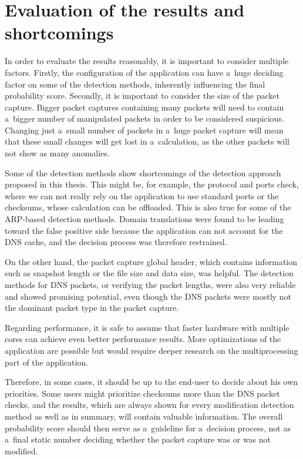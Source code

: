 \documentclass[
  printed,     %
  color,       %
  oneside,     %
  nosansbold,  %
  nocolorbold, %
  nolof,         %
  nolot,         %
]{fithesis4}
\begin{document}
\section{Evaluation of the results and shortcomings}

In order to evaluate the results reasonably, it is important to consider multiple factors. Firstly, the configuration of the application can have a~huge deciding factor on some of the detection methods, inherently influencing the final probability score. Secondly, it is important to consider the size of the packet capture. Bigger packet captures containing many packets will need to contain a~bigger number of manipulated packets in order to be considered suspicious. Changing just a~small number of packets in a~huge packet capture will mean that these small changes will get lost in a~calculation, as the other packets will not show as many anomalies.

Some of the detection methods show shortcomings of the detection approach proposed in this thesis. This might be, for example, the protocol and ports check, where we can not really rely on the application to use standard ports or the checksums, whose calculation can be offloaded. This is also true for some of the ARP-based detection methods. Domain translations were found to be leading toward the false positive side because the application can not account for the DNS cache, and the decision process was therefore restrained.

On the other hand, the packet capture global header, which contains information such as snapshot length or the file size and data size, was helpful. The detection methods for DNS packets, or verifying the packet lengths, were also very reliable and showed promising potential, even though the DNS packets were mostly not the dominant packet type in the packet capture.

Regarding performance, it is safe to assume that faster hardware with multiple cores can achieve even better performance results. More optimizations of the application are possible but would require deeper research on the multiprocessing part of the application.

Therefore, in some cases, it should be up to the end-user to decide about his own priorities. Some users might prioritize checksums more than the DNS packet checks, and the results, which are always shown for every modification detection method as well as in summary, will contain valuable information. The overall probability score should then serve as a~guideline for a~decision process, not as a~final static number deciding whether the packet capture was or was not modified.
\end{document}

